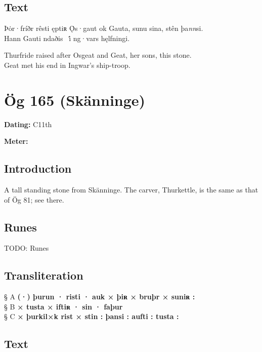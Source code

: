 \subsection{Text}

\bpg\bpa[0]%
\startsub Þȯr·fríðr rêsti ęptiʀ Ǫ̇s·gaut ok Gauta, sunu sina, stên þa\emph{nn}si.\endsub \\
Hann Gauti ndaðis \hld\ i̇́ ng·vars hęlfningi.\epa

\bpb Thurfride raised after Osgeat and Geat, her sons, this stone. \\
Geat met his end in Ingwar’s ship-troop.\epb\epg

\sectionline\clearpage


\section{Ög 165 (Skänninge)}

\begin{flushright}%
\textbf{Dating:} C11th

\textbf{Meter:} \Fornyrdislag
\end{flushright}%

\subsection{Introduction}

A tall standing stone from Skänninge.  The carver, Thurkettle, is the same as that of Ög 81; see there.

\subsection{Runes}

TODO: Runes%

\subsection{Transliteration}

§ A \textbf{(·) þurun · risti · auk × þiʀ × bruþr × suniʀ :} \\
§ B \textbf{× tusta × iftiʀ · sin · faþur} \\
§ C \textbf{× þurkil×k rist × stin : þansi : aufti : tusta :}

\subsection{Text}

